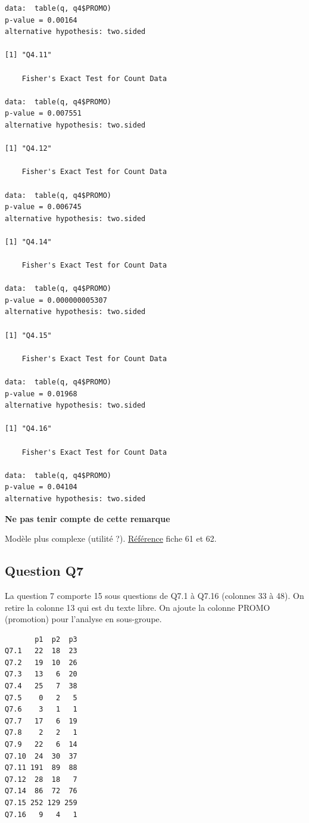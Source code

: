 \documentclass[]{article}
\newenvironment{Shaded}{\begin{snugshade}}{\end{snugshade}}
\newcommand{\CommentTok}[1]{\textcolor[rgb]{0.56,0.35,0.01}{\textit{{#1}}}}
\begin{document}
\begin{verbatim}
data:  table(q, q4$PROMO)
p-value = 0.00164
alternative hypothesis: two.sided

[1] "Q4.11"

    Fisher's Exact Test for Count Data

data:  table(q, q4$PROMO)
p-value = 0.007551
alternative hypothesis: two.sided

[1] "Q4.12"

    Fisher's Exact Test for Count Data

data:  table(q, q4$PROMO)
p-value = 0.006745
alternative hypothesis: two.sided

[1] "Q4.14"

    Fisher's Exact Test for Count Data

data:  table(q, q4$PROMO)
p-value = 0.000000005307
alternative hypothesis: two.sided

[1] "Q4.15"

    Fisher's Exact Test for Count Data

data:  table(q, q4$PROMO)
p-value = 0.01968
alternative hypothesis: two.sided

[1] "Q4.16"

    Fisher's Exact Test for Count Data

data:  table(q, q4$PROMO)
p-value = 0.04104
alternative hypothesis: two.sided
\end{verbatim}

\textbf{Ne pas tenir compte de cette remarque}

Modèle plus complexe (utilité ?).
\href{http://cran.r-project.org/doc/contrib/Herve-Aide-memoire-statistique.pdf}{Référence}
fiche 61 et 62.

\begin{Shaded}
\end{Shaded}

\subsection{Question Q7}\label{question-q7}

La question 7 comporte 15 sous questions de Q7.1 à Q7.16 (colonnes 33 à
48). On retire la colonne 13 qui est du texte libre. On ajoute la
colonne PROMO (promotion) pour l'analyse en sous-groupe.

\begin{verbatim}
       p1  p2  p3
Q7.1   22  18  23
Q7.2   19  10  26
Q7.3   13   6  20
Q7.4   25   7  38
Q7.5    0   2   5
Q7.6    3   1   1
Q7.7   17   6  19
Q7.8    2   2   1
Q7.9   22   6  14
Q7.10  24  30  37
Q7.11 191  89  88
Q7.12  28  18   7
Q7.14  86  72  76
Q7.15 252 129 259
Q7.16   9   4   1
\end{verbatim}
\end{document}

